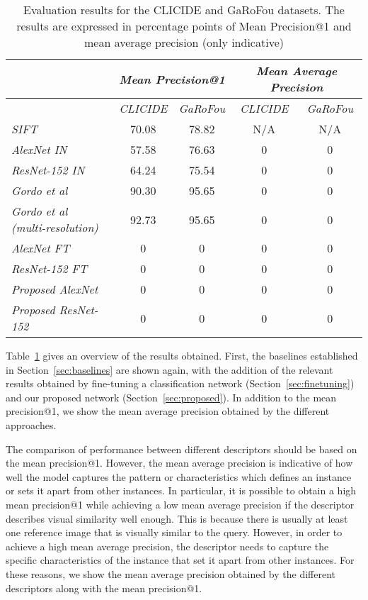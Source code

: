 \begin{table}
\begin{tabular}{|l|c|c|c|c|}
\hline & \multicolumn{2}{c|}{\emph{Mean Precision@1}} &
\multicolumn{2}{c|}{\emph{Mean Average Precision}}\\
\hline & \emph{CLICIDE} & \emph{GaRoFou} & \emph{CLICIDE} & \emph{GaRoFou}\\
\hline \emph{SIFT} & 70.08 & 78.82 & N/A & N/A\\
\hline \emph{AlexNet IN} & 57.58 & 76.63 & 0 & 0\\
\hline \emph{ResNet-152 IN} & 64.24 & 75.54 & 0 & 0\\
\hline \emph{Gordo et al~\cite{gordo_deep_2016}}
& 90.30 & 95.65 & 0 & 0\\
\hline \emph{Gordo et al~\cite{gordo_deep_2016} (multi-resolution)}
& 92.73 & 95.65 & 0 & 0\\
\hline \emph{AlexNet FT} & 0 & 0 & 0 & 0\\ %
\hline \emph{ResNet-152 FT} & 0 & 0 & 0 & 0\\
\hline \emph{Proposed AlexNet} & 0 & 0 & 0 & 0\\ %
\hline \emph{Proposed ResNet-152} & 0 & 0 & 0 & 0\\
\hline
\end{tabular}
\caption{Evaluation results for the CLICIDE and GaRoFou datasets.
The results are expressed in percentage points of
Mean Precision@1 and mean average precision (only indicative)
\label{tab:results}}
\end{table}

Table~\ref{tab:results} gives an overview of the results obtained. First,
the baselines established in Section~\ref{sec:baselines} are shown
again, with the addition of the relevant results obtained by fine-tuning
a classification network (Section~\ref{sec:finetuning}) and our
proposed network (Section~\ref{sec:proposed}).
In addition to the mean precision@1, we show the mean average
precision obtained by the different approaches.

The comparison of performance between different descriptors should
be based on the mean precision@1. However, the mean average
precision is indicative of how well the model
captures the pattern or characteristics which defines an instance or
sets it apart from other instances. In particular, it is possible to obtain
a high mean precision@1 while achieving a low mean average precision
if the descriptor describes visual similarity well enough. This is because
there is usually at least one reference image that is visually similar
to the query. However, in order to achieve a high mean average precision,
the descriptor needs to capture the specific characteristics of the
instance that set it apart from other instances. For these reasons,
we show the mean average precision obtained by the different
descriptors along with the mean precision@1.


